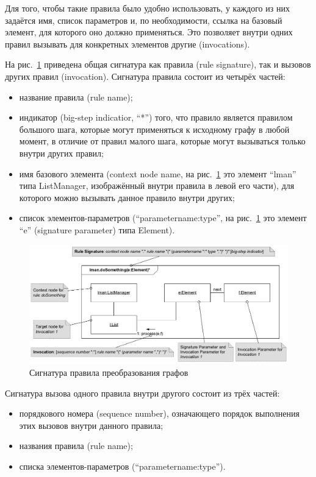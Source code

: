 \documentclass[a5paper]{article}
\begin{document}
Для того, чтобы такие правила было удобно использовать, у каждого из них задаётся имя, список параметров и, по необходимости, ссылка на базовый элемент, для которого оно должно применяться. Это позволяет внутри одних правил вызывать для конкретных элементов другие (invocations).

На рис.~\ref{fig5} приведена общая сигнатура как правила (rule signature), так и вызовов других правил (invocation). Сигнатура правила состоит из четырёх частей: 
\begin{itemize}
 \item название правила (rule name);
 \item индикатор (big-step indicatior, “*”) того, что правило является правилом большого шага, которые могут применяться к исходному графу в любой момент, в отличие от правил малого шага, которые могут вызываться только внутри других правил;
 \item имя базового элемента (context node name, на рис.~\ref{fig5} это элемент “lman” типа ListManager, изображённый внутри правила в левой его части), для которого можно вызывать данное правило внутри других;
 \item список элементов-параметров (“parametername:type”, на рис.~\ref{fig5} это элемент “e” (signature parameter) типа Element).
\end{itemize}

\begin{figure} [ht]
  \begin{center}
    \includegraphics[width=1\textwidth]{dmm-signature.png}
    \caption{Сигнатура правила преобразования графов}
    \label{fig5}
  \end{center}
\end{figure}

Сигнатура вызова одного правила внутри другого состоит из трёх частей:
\begin{itemize}
 \item порядкового номера (sequence number), означающего порядок выполнения этих вызовов внутри данного правила;
 \item названия правила (rule name);
 \item списка элементов-параметров (“parametername:type”).
\end{itemize}
\end{document}
